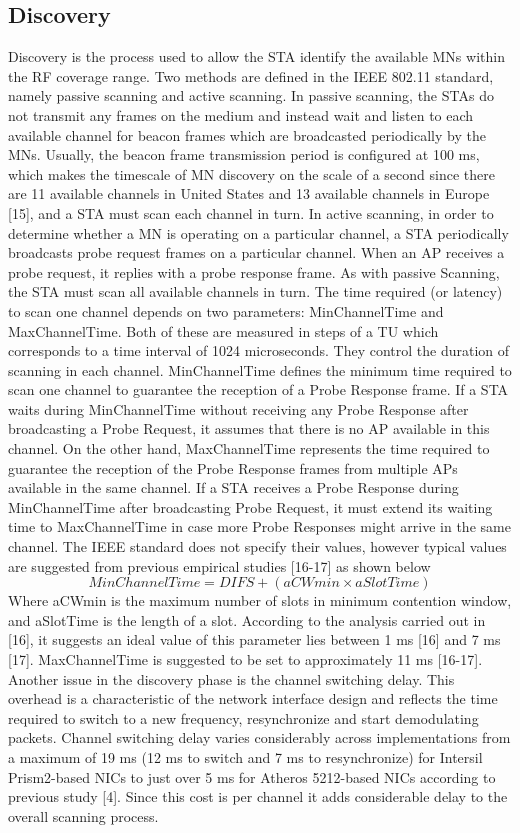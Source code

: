 \documentclass[12pt,a4paper]{report}
\begin{document}
\subsection{Discovery}
Discovery is the process used to allow the STA identify the available MNs within the RF coverage range. Two methods are defined in the IEEE 802.11 standard, namely passive scanning and active scanning. In passive scanning, the STAs do not transmit any frames on the medium and instead wait and listen to each available channel for beacon frames which are broadcasted periodically by the MNs. Usually, the beacon frame transmission period is configured at 100 ms, which makes the timescale of MN discovery on the scale of a second since there are 11 available channels in United States and 13 available channels in Europe [15], and a STA must scan each channel in turn. In active scanning, in order to determine whether a MN is operating on a particular channel, a STA periodically broadcasts probe request frames on a particular channel. When an AP receives a probe request, it replies with a probe response frame. As with passive Scanning, the STA must scan all available channels in turn. The time required (or latency) to scan one channel depends on two parameters: MinChannelTime and MaxChannelTime. Both of these are measured in steps of a TU which corresponds to a time interval of 1024 microseconds. They control the duration of scanning in each channel. MinChannelTime defines the minimum time required to scan one channel to guarantee the reception of a Probe Response frame. If a STA waits during MinChannelTime without receiving any Probe Response after broadcasting a Probe Request, it assumes that there is no AP available in this channel. On the other hand, MaxChannelTime represents the time required to guarantee the reception of the Probe Response frames from multiple APs available in the same channel. If a STA receives a Probe Response during MinChannelTime after broadcasting Probe Request, it must extend its waiting time to MaxChannelTime in case more Probe Responses might arrive in the same channel. The IEEE standard does not specify their values, however typical values are suggested from previous empirical studies [16-17] as shown below  
$$MinChannelTime = DIFS + (aCWmin× aSlotTime)$$ 
Where aCWmin is the maximum number of slots in minimum contention window, and aSlotTime is the length of a slot. According to the analysis carried out in [16], it suggests an ideal value of this parameter lies between 1 ms [16] and 7 ms [17].
MaxChannelTime is suggested to be set to approximately 11 ms [16-17]. Another issue in the discovery phase is the channel switching delay. This overhead is a characteristic of the network interface design and reflects the time required to switch to a new frequency, resynchronize and start demodulating packets. Channel switching delay varies considerably across implementations from a maximum of 19 ms (12 ms to switch and 7 ms to resynchronize) for Intersil Prism2-based NICs to just over 5 ms for Atheros 5212-based NICs according to previous study [4]. Since this cost is per channel it adds considerable delay to the overall scanning process.
\end{document}
